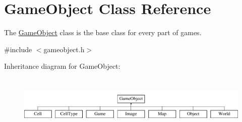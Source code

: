 \hypertarget{class_game_object}{\section{\-Game\-Object \-Class \-Reference}
\label{class_game_object}
}


\-The \hyperlink{class_game_object}{\-Game\-Object} class is the base class for every part of games.  




{\ttfamily \#include $<$gameobject.\-h$>$}

\-Inheritance diagram for \-Game\-Object\-:\begin{figure}[H]
\begin{center}
\leavevmode
\includegraphics[height=2.750154cm]{class_game_object}
\end{center}
\end{figure}
